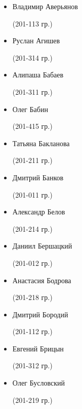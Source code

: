 \setlength{\columnsep}{0.5em}
\begin{multicols}{2}
\begin{small}
\begin{itemize}[leftmargin=0.5em]\itemsep1pt \parskip0pt 

	\item[] Владимир Аверьянов\begin{tiny} (201-113 гр.)\end{tiny} %
	\item[] Руслан Агишев\begin{tiny} (201-314 гр.)\end{tiny} %

	\item[] Алипаша Бабаев\begin{tiny} (201-311 гр.)\end{tiny} %
	\item[] Олег Бабин\begin{tiny} (201-415 гр.)\end{tiny} %
	\item[] Татьяна Бакланова\begin{tiny} (201-211 гр.)\end{tiny}
	\item[] Дмитрий Банков\begin{tiny} (201-011 гр.)\end{tiny}
	\item[] Александр Белов\begin{tiny} (201-214 гр.)\end{tiny}
	\item[] Даниил Бершацкий\begin{tiny} (201-012 гр.)\end{tiny}
	\item[] Анастасия Бодрова\begin{tiny} (201-218 гр.)\end{tiny} %
	\item[] Дмитрий Бородий\begin{tiny} (201-112 гр.)\end{tiny}
	\item[] Евгений Брицын\begin{tiny} (201-312 гр.)\end{tiny} %
	\item[] Олег Бусловский\begin{tiny} (201-219 гр.)\end{tiny} %


\end{itemize}
\end{small}
\end{multicols}
